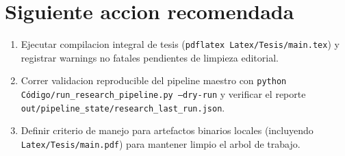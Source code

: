\documentclass[11pt]{article}
\begin{document}
\section{Siguiente accion recomendada}
\begin{enumerate}
  \item Ejecutar compilacion integral de tesis (\texttt{pdflatex Latex/Tesis/main.tex}) y registrar warnings no fatales pendientes de limpieza editorial.
  \item Correr validacion reproducible del pipeline maestro con \texttt{python C\'odigo/run\_research\_pipeline.py --dry-run} y verificar el reporte \texttt{out/pipeline\_state/research\_last\_run.json}.
  \item Definir criterio de manejo para artefactos binarios locales (incluyendo \texttt{Latex/Tesis/main.pdf}) para mantener limpio el arbol de trabajo.
\end{enumerate}
\end{document}
